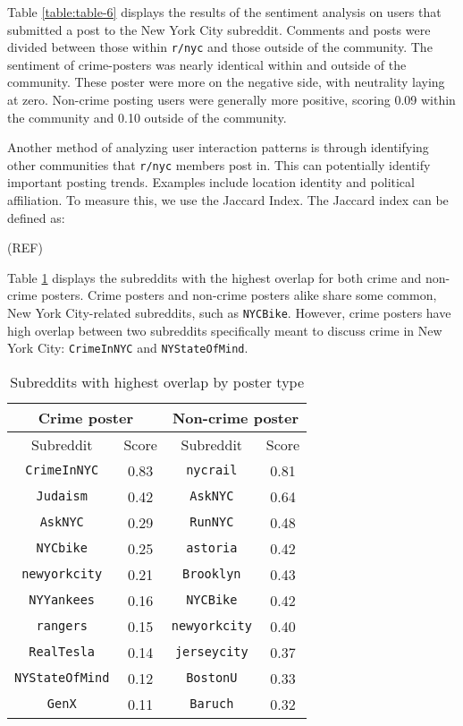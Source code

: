 \documentclass[12pt,oneside, letterpaper]{book}
\begin{document}
\par Table \ref{table:table-6} displays the results of the sentiment analysis on users that submitted a post to the New York City subreddit. Comments and posts were divided between those within \texttt{r/nyc} and those outside of the community. The sentiment of crime-posters was nearly identical within and outside of the community. These poster were more on the negative side, with neutrality laying at zero. Non-crime posting users were generally more positive, scoring 0.09 within the community and 0.10 outside of the community.

\par Another method of analyzing user interaction patterns is through identifying other communities that \texttt{r/nyc} members post in. This can potentially identify important posting trends. Examples include location identity and political affiliation. To measure this, we use the Jaccard Index. The Jaccard index can be defined as:

(REF)

\par Table \ref{table:table-7} displays the subreddits with the highest overlap for both crime and non-crime posters. Crime posters and non-crime posters alike share some common, New York City-related subreddits, such as \texttt{NYCBike}. However, crime posters have high overlap between two subreddits specifically meant to discuss crime in New York City: \texttt{CrimeInNYC} and \texttt{NYStateOfMind}.

\begin{table}[h!]
    \centering
    \small
    \caption{Subreddits with highest overlap by poster type}
    \begin{tabular}{| c | c | c | c |}
    \hline
    \multicolumn{2}{|c|}{Crime poster} & \multicolumn{2}{|c|}{Non-crime poster} \\ \hline
    Subreddit & Score & Subreddit & Score\\ \hline
    \texttt{CrimeInNYC} & 0.83 & \texttt{nycrail} & 0.81 \\ \hline
    \texttt{Judaism} & 0.42 & \texttt{AskNYC} & 0.64 \\ \hline
    \texttt{AskNYC} & 0.29 & \texttt{RunNYC} & 0.48 \\ \hline
    \texttt{NYCbike} & 0.25 & \texttt{astoria} & 0.42 \\ \hline
    \texttt{newyorkcity} & 0.21 & \texttt{Brooklyn} & 0.43 \\ \hline
    \texttt{NYYankees} & 0.16 & \texttt{NYCBike} & 0.42 \\ \hline
    \texttt{rangers} & 0.15 & \texttt{newyorkcity} & 0.40 \\ \hline
    \texttt{RealTesla} & 0.14 & \texttt{jerseycity} & 0.37 \\ \hline
    \texttt{NYStateOfMind} & 0.12 & \texttt{BostonU} & 0.33 \\ \hline
    \texttt{GenX} & 0.11 & \texttt{Baruch} & 0.32 \\ \hline
	\end{tabular}
	\label{table:table-7}
\end{table}
\end{document}
